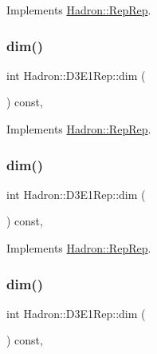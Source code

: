 Implements \mbox{\hyperlink{structHadron_1_1RepRep_a92c8802e5ed7afd7da43ccfd5b7cd92b}{Hadron\+::\+Rep\+Rep}}.

\mbox{\label{structHadron_1_1D3E1Rep_af48681bf92a948c02889dcaa4a44812b}} 
\subsubsection{\texorpdfstring{dim()}{dim()}\hspace{0.1cm}{\footnotesize\ttfamily [3/5]}}
{\footnotesize\ttfamily int Hadron\+::\+D3\+E1\+Rep\+::dim (\begin{DoxyParamCaption}{ }\end{DoxyParamCaption}) const\hspace{0.3cm}{\ttfamily [inline]}, {\ttfamily [virtual]}}



Implements \mbox{\hyperlink{structHadron_1_1RepRep_a92c8802e5ed7afd7da43ccfd5b7cd92b}{Hadron\+::\+Rep\+Rep}}.

\mbox{\label{structHadron_1_1D3E1Rep_af48681bf92a948c02889dcaa4a44812b}} 
\subsubsection{\texorpdfstring{dim()}{dim()}\hspace{0.1cm}{\footnotesize\ttfamily [4/5]}}
{\footnotesize\ttfamily int Hadron\+::\+D3\+E1\+Rep\+::dim (\begin{DoxyParamCaption}{ }\end{DoxyParamCaption}) const\hspace{0.3cm}{\ttfamily [inline]}, {\ttfamily [virtual]}}



Implements \mbox{\hyperlink{structHadron_1_1RepRep_a92c8802e5ed7afd7da43ccfd5b7cd92b}{Hadron\+::\+Rep\+Rep}}.

\mbox{\label{structHadron_1_1D3E1Rep_af48681bf92a948c02889dcaa4a44812b}} 
\subsubsection{\texorpdfstring{dim()}{dim()}\hspace{0.1cm}{\footnotesize\ttfamily [5/5]}}
{\footnotesize\ttfamily int Hadron\+::\+D3\+E1\+Rep\+::dim (\begin{DoxyParamCaption}{ }\end{DoxyParamCaption}) const\hspace{0.3cm}{\ttfamily [inline]}, {\ttfamily [virtual]}}



